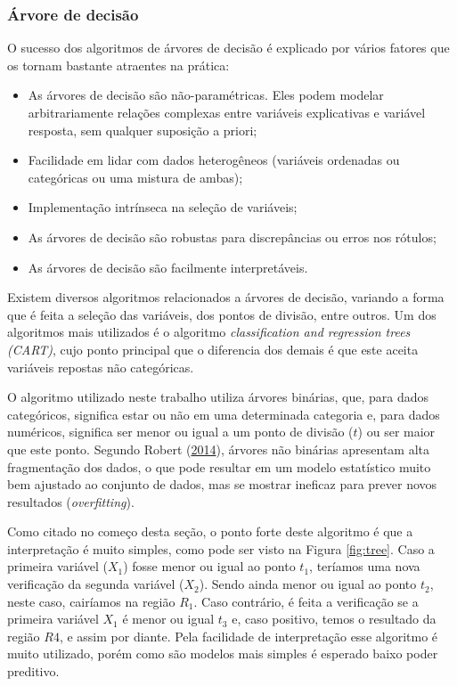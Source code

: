 \documentclass[
	12pt,				%
	a4paper,		%
	oneside,    %
	chapter=TITLE,		   %
	section=TITLE,		   %
	subsection=TITLE,	   %
	subsubsection=TITLE, %
	english,			%
	french,				%
	spanish,			%
	brazil,				%
]{abntex2}
\providecommand{\tightlist}{%
	\setlength{\itemsep}{0pt}\setlength{\parskip}{0pt}}
\begin{document}
\hypertarget{uxe1rvore-de-decisuxe3o}{%
\subsubsection{Árvore de decisão}\label{uxe1rvore-de-decisuxe3o}}

O sucesso dos algoritmos de árvores de decisão é explicado por vários
fatores que os tornam bastante atraentes na prática:

\begin{itemize}
\tightlist
\item
  As árvores de decisão são não-paramétricas. Eles podem modelar
  arbitrariamente relações complexas entre variáveis explicativas e
  variável resposta, sem qualquer suposição a priori;
\item
  Facilidade em lidar com dados heterogêneos (variáveis ordenadas ou
  categóricas ou uma mistura de ambas);
\item
  Implementação intrínseca na seleção de variáveis;
\item
  As árvores de decisão são robustas para discrepâncias ou erros nos
  rótulos;
\item
  As árvores de decisão são facilmente interpretáveis.
\end{itemize}

Existem diversos algoritmos relacionados a árvores de decisão, variando
a forma que é feita a seleção das variáveis, dos pontos de divisão,
entre outros. Um dos algoritmos mais utilizados é o algoritmo
\emph{classification and regression trees (CART)}, cujo ponto principal
que o diferencia dos demais é que este aceita variáveis repostas não
categóricas.

O algoritmo utilizado neste trabalho utiliza árvores binárias, que, para
dados categóricos, significa estar ou não em uma determinada categoria
e, para dados numéricos, significa ser menor ou igual a um ponto de
divisão (\(t\)) ou ser maior que este ponto. Segundo Robert
(\protect\hyperlink{ref-robert2014machine}{2014}), árvores não binárias
apresentam alta fragmentação dos dados, o que pode resultar em um modelo
estatístico muito bem ajustado ao conjunto de dados, mas se mostrar
ineficaz para prever novos resultados (\emph{overfitting}).

Como citado no começo desta seção, o ponto forte deste algoritmo é que a
interpretação é muito simples, como pode ser visto na Figura
\ref{fig:tree}. Caso a primeira variável (\(X_1\)) fosse menor ou igual
ao ponto \(t_1\), teríamos uma nova verificação da segunda variável
(\(X_2\)). Sendo ainda menor ou igual ao ponto \(t_2\), neste caso,
cairíamos na região \(R_1\). Caso contrário, é feita a verificação se a
primeira variável \(X_1\) é menor ou igual \(t_3\) e, caso positivo,
temos o resultado da região \(R4\), e assim por diante. Pela facilidade
de interpretação esse algoritmo é muito utilizado, porém como são
modelos mais simples é esperado baixo poder preditivo.
\end{document}
